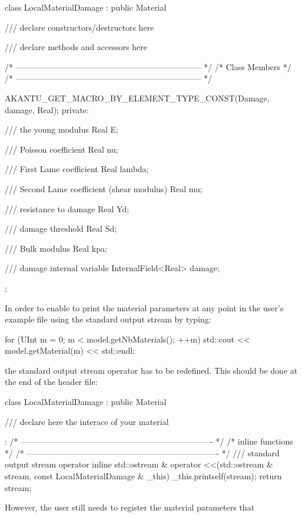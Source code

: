 \begin{cpp}
class LocalMaterialDamage : public Material {

/// declare constructors/destructors here

/// declare methods and accessors here

  /* -------------------------------------------------------------------- */
  /* Class Members                                                        */
  /* -------------------------------------------------------------------- */

  AKANTU_GET_MACRO_BY_ELEMENT_TYPE_CONST(Damage, damage, Real);
private:

  /// the young modulus
  Real E;

  /// Poisson coefficient
  Real nu;

  /// First Lame coefficient
  Real lambda;

  /// Second Lame coefficient (shear modulus)
  Real mu;

  /// resistance to damage
  Real Yd;

  /// damage threshold
  Real Sd;

  /// Bulk modulus
  Real kpa;

  /// damage internal variable
  InternalField<Real> damage;

};
\end{cpp}
In order to enable to print the material parameters at any point in
the user's example file using the standard output stream by typing:
\begin{cpp}
for (UInt m = 0; m  < model.getNbMaterials(); ++m) 
  std::cout << model.getMaterial(m) << std::endl;
\end{cpp}
the standard output stream operator has to be redefined. This should be done at the end of the header file:
\begin{cpp}
class LocalMaterialDamage : public Material {

  /// declare here the interace of your material

}:
/* ---------------------------------------------------------------------- */
/* inline functions                                                       */
/* ---------------------------------------------------------------------- */
/// standard output stream operator
inline std::ostream & operator <<(std::ostream & stream, const LocalMaterialDamage & _this)
{
  _this.printself(stream);
  return stream;
}
\end{cpp}
However, the user still needs to register the material parameters that
